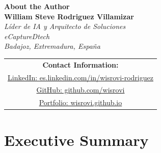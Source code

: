 \documentclass[12pt,a4paper]{report}
\begin{document}
\begin{titlepage}
    \centering
    \vspace*{3cm}

    {\color{blue!70!black}\Large\textbf{\sffamily About the Author}}\\[1.5cm]

    {\Large\textbf{\sffamily William Steve Rodriguez Villamizar}}\\[0.5cm]
    {\large\sffamily\textit{Líder de IA y Arquitecto de Soluciones}}\\[0.3cm]
    {\large\sffamily\textit{eCaptureDtech}}\\[0.2cm]
    {\large\sffamily\textit{Badajoz, Extremadura, España}}\\[1.5cm]

    \begin{tabular}{c}
        \Large\textbf{\sffamily Contact Information:}\\[0.8cm]
        \href{https://es.linkedin.com/in/wisrovi-rodriguez}{\Large LinkedIn: es.linkedin.com/in/wisrovi-rodriguez}\\[0.4cm]
        \href{https://github.com/wisrovi}{\Large GitHub: github.com/wisrovi}\\[0.4cm]
        \href{https://wisrovi.github.io}{\Large Portfolio: wisrovi.github.io}
    \end{tabular}

    \vspace{2cm}
    \vfill

\end{titlepage}

\chapter{Executive Summary}
\cleardoublepage
\end{document}
